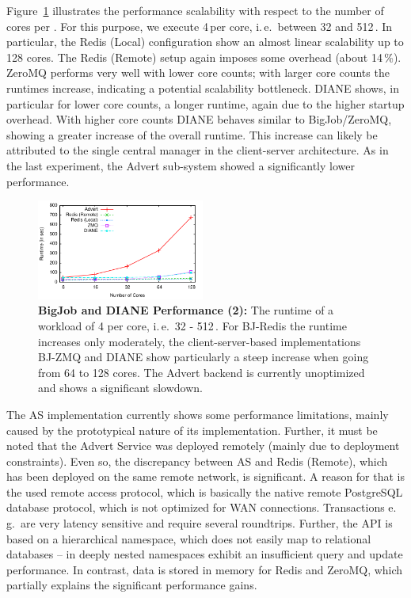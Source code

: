 \documentclass{sig-alternate}
\begin{document}
Figure~\ref{fig:perf_bigjob-varying-cores} illustrates the performance
scalability with respect to the number of cores per \pilot. For this purpose, we
execute 4\,\cus per core, i.\,e.\ between 32 and 512\,\cus. In particular, the
Redis (Local) configuration show an almost linear scalability up to 128 cores.
The Redis (Remote) setup again imposes some overhead (about 14\,\%). ZeroMQ
performs very well with lower core counts; with larger core counts the runtimes
increase, indicating a potential scalability bottleneck. DIANE shows, in
particular for lower core counts, a longer runtime, again due to the higher
startup overhead. With higher core counts DIANE behaves similar to
BigJob/ZeroMQ, showing a greater increase of the overall runtime. This increase
can likely be attributed to the single central manager in the client-server
architecture. As in the last experiment, the Advert \cc sub-system showed a
significantly lower performance.

\begin{figure}[htbp] 
 \centering
 \includegraphics[width=0.49\textwidth]{perf/bigjob-varying-cores-alamo.pdf}
 \up\up
 \caption{\textbf{BigJob and DIANE Performance (2):}  The
  runtime of a workload of 4 \cus per core, i.\,e.\ 32 - 512\,\cus. For BJ-Redis 
  the runtime 
  increases only moderately, the client-server-based implementations BJ-ZMQ and 
  DIANE show particularly a steep increase when going from 64 to 128 cores. The 
  Advert backend is currently unoptimized and shows a significant slowdown.
  }
 \label{fig:perf_bigjob-varying-cores} 
\end{figure}

The AS implementation currently shows some performance
limitations, mainly caused by the prototypical nature of its
implementation.  Further, it must be noted that the Advert Service was
deployed remotely (mainly due to deployment constraints). Even so, the
discrepancy between AS and Redis (Remote), which has been
deployed on the same remote network, is significant. A reason for that
is the used remote access protocol, which is basically the native
remote PostgreSQL database protocol, which is not optimized for WAN
connections.
%
%
Transactions e.\,g.\ are very latency sensitive and require several
roundtrips.  Further, the API is based on a hierarchical namespace,
which does not easily map to relational databases -- in deeply nested
namespaces exhibit an insufficient query and update performance. In
contrast, data is stored in memory for Redis and ZeroMQ, which
partially explains the significant performance gains.
\end{document}
